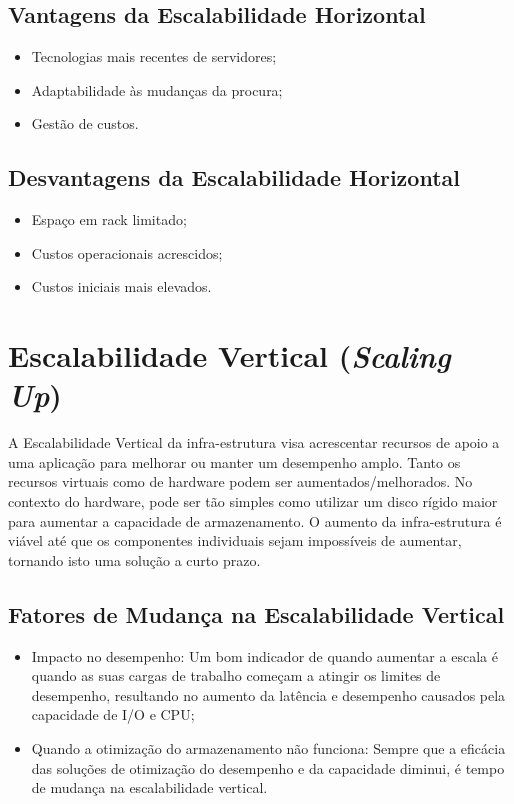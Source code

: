 \subsection{Vantagens da Escalabilidade Horizontal}
\begin{itemize}
    \item Tecnologias mais recentes de servidores;
    \item Adaptabilidade às mudanças da procura;
    \item Gestão de custos.
\end{itemize}

\subsection{Desvantagens da Escalabilidade Horizontal}
\begin{itemize}
    \item Espaço em rack limitado;
    \item Custos operacionais acrescidos;
    \item Custos iniciais mais elevados.
\end{itemize}

\section{Escalabilidade Vertical (\textit{Scaling Up})}
A Escalabilidade Vertical da infra-estrutura visa acrescentar recursos de apoio a uma aplicação para melhorar ou manter um desempenho amplo. Tanto os recursos virtuais como de hardware podem ser aumentados/melhorados. No contexto do hardware, pode ser tão simples como utilizar um disco rígido maior para aumentar a capacidade de armazenamento.
O aumento da infra-estrutura é viável até que os componentes individuais sejam impossíveis de aumentar, tornando isto uma solução a curto prazo.

\subsection{Fatores de Mudança na Escalabilidade Vertical}
\begin{itemize}
    \item Impacto no desempenho: Um bom indicador de quando aumentar a escala é quando as suas cargas de trabalho começam a atingir os limites de desempenho, resultando no aumento da latência e desempenho causados pela capacidade de \ac{I/O} e \ac{CPU};
    \item Quando a otimização do armazenamento não funciona: Sempre que a eficácia das soluções de otimização do desempenho e da capacidade diminui, é tempo de mudança na escalabilidade vertical.
\end{itemize}

